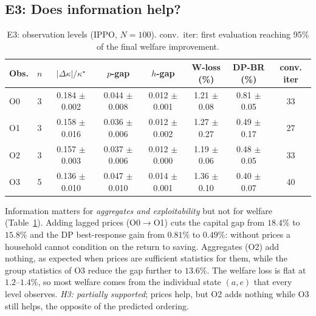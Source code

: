 \documentclass{article}
\begin{document}
\subsection{E3: Does information help?}
\begin{table}[!htbp]
\centering
\caption{E3: observation levels (IPPO, $N=100$). conv.\ iter: first evaluation reaching 95\% of the final welfare improvement.}
\label{tab:e3}
\small
\begin{tabular}{lccccccc}
\toprule
Obs. & $n$ & $|\Delta\kappa|/\kappa^\star$ & $p$-gap & $h$-gap & W-loss (\%) & DP-BR (\%) & conv. iter\\
\midrule
O0 & 3 & 0.184 $\pm$ 0.002 & 0.044 $\pm$ 0.008 & 0.012 $\pm$ 0.001 & 1.21 $\pm$ 0.08 & 0.81 $\pm$ 0.05 & 33\\
O1 & 3 & 0.158 $\pm$ 0.016 & 0.036 $\pm$ 0.006 & 0.012 $\pm$ 0.002 & 1.27 $\pm$ 0.27 & 0.49 $\pm$ 0.17 & 27\\
O2 & 3 & 0.157 $\pm$ 0.003 & 0.037 $\pm$ 0.006 & 0.012 $\pm$ 0.000 & 1.19 $\pm$ 0.06 & 0.48 $\pm$ 0.05 & 33\\
O3 & 5 & 0.136 $\pm$ 0.010 & 0.047 $\pm$ 0.010 & 0.014 $\pm$ 0.001 & 1.36 $\pm$ 0.10 & 0.40 $\pm$ 0.07 & 40\\
\bottomrule
\end{tabular}
\end{table}

Information matters for \emph{aggregates and exploitability} but not for welfare (Table~\ref{tab:e3}). Adding lagged prices (O0$\to$O1) cuts the capital gap from $18.4\%$ to $15.8\%$ and the DP best-response gain from $0.81\%$ to $0.49\%$: without prices a household cannot condition on the return to saving. Aggregates (O2) add nothing, as expected when prices are sufficient statistics for them, while the group statistics of O3 reduce the gap further to $13.6\%$. The welfare loss is flat at $1.2$--$1.4\%$, so most welfare comes from the individual state $(a,e)$ that every level observes. \emph{H3: partially supported}; prices help, but O2 adds nothing while O3 still helps, the opposite of the predicted ordering.
\end{document}
